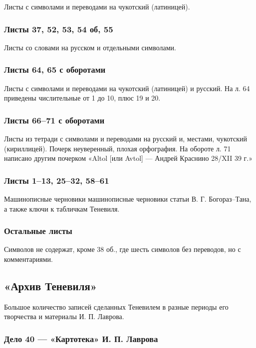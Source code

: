 \documentclass{article}
\begin{document}
Листы с символами и переводами на чукотский (латиницей).

\subsubsection{Листы 37, 52, 53, 54 об, 55}

Листы со словами на русском и отдельными символами.

\subsubsection{Листы 64, 65 с оборотами}

Листы с символами и переводами на чукотский (латиницей) и русский. На л. 64 приведены числительные от 1 до 10, плюс 19 и 20.

\subsubsection{Листы 66–71 с оборотами}

Листы из тетради с символами и переводами на русский и, местами, чукотский (кириллицей). Почерк неуверенный, плохая орфография. На обороте л. 71 написано другим почерком «Altol [или Avtol] — Андрей Краснино 28/XII 39 г.»

\subsubsection{Листы 1–13, 25–32, 58–61}
Машинописные черновики машинописные черновики статьи В. Г. Богораз–Тана, а также ключи к табличкам Теневиля.

\subsubsection{Остальные листы}

Символов не содержат, кроме 38 об., где шесть символов без переводов, но с комментариями.

\subsection{«Архив Теневиля»}

Большое количество записей сделанных Теневилем в разные периоды его творчества и материалы И. П. Лаврова.

\subsubsection{Дело 40 — «Картотека» И. П. Лаврова}
\end{document}

